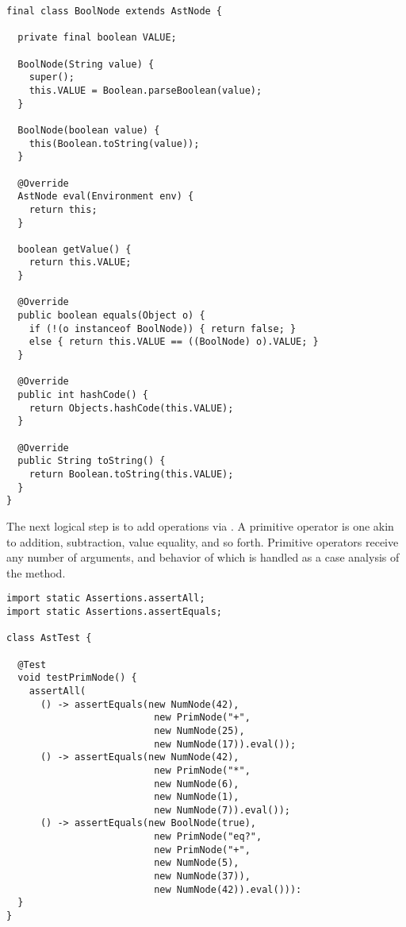 \begin{lstlisting}[language=MyJava]
final class BoolNode extends AstNode {

  private final boolean VALUE;

  BoolNode(String value) {
    super();
    this.VALUE = Boolean.parseBoolean(value);
  }

  BoolNode(boolean value) { 
    this(Boolean.toString(value)); 
  }

  @Override
  AstNode eval(Environment env) { 
    return this; 
  }
  
  boolean getValue() {
    return this.VALUE;
  }

  @Override
  public boolean equals(Object o) {
    if (!(o instanceof BoolNode)) { return false; }
    else { return this.VALUE == ((BoolNode) o).VALUE; }
  }
  
  @Override
  public int hashCode() {
    return Objects.hashCode(this.VALUE);
  }

  @Override
  public String toString() { 
    return Boolean.toString(this.VALUE); 
  }
}
\end{lstlisting}

The next logical step is to add operations via . A primitive operator is one akin to addition, subtraction, value equality, and so forth. Primitive operators receive any number of arguments, and behavior of which is handled as a case analysis of the  method. 

\begin{lstlisting}[language=MyJava]
import static Assertions.assertAll;
import static Assertions.assertEquals;

class AstTest {

  @Test
  void testPrimNode() {
    assertAll(
      () -> assertEquals(new NumNode(42),
                          new PrimNode("+", 
                          new NumNode(25), 
                          new NumNode(17)).eval());
      () -> assertEquals(new NumNode(42),
                          new PrimNode("*", 
                          new NumNode(6), 
                          new NumNode(1), 
                          new NumNode(7)).eval());
      () -> assertEquals(new BoolNode(true),
                          new PrimNode("eq?",
                          new PrimNode("+", 
                          new NumNode(5),
                          new NumNode(37)),
                          new NumNode(42)).eval())):
  }
}
\end{lstlisting}

